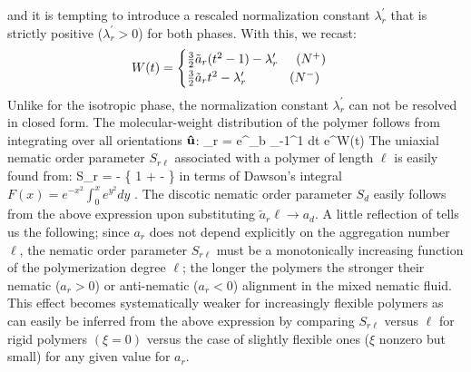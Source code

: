 and it is tempting to introduce a rescaled  normalization constant $\lambda_{r}^{\prime}$ that is strictly positive ($\lambda_{r}^{\prime} > 0$) for both phases. With this, we recast:
  \begin{align}
W(t) =  
\begin{cases}
\frac{3}{2} \tilde{a}_{r} (t^{2} -1) - \lambda_{r}^{\prime} \hspace{0.5cm}  (N^{+})   \\
\frac{3}{2} \tilde{a}_{r} t^{2}  - \lambda_{r}^{\prime} \hspace{1.2cm}  (N^{-}) 
\end{cases}
 \end{align}
 Unlike for the isotropic phase, the normalization constant $\lambda_{r}^{\prime}$ can not be resolved in closed form. The  molecular-weight distribution of the polymer follows from integrating  over all orientations ${\bf \hat{u}}$:
 \beq
 \rho_{r \ell} = \ell e^{\varepsilon_{b}}  \int_{-1}^{1} dt e^{\ell W(t)}
 \eeq
The uniaxial nematic order parameter $S_{r \ell}$ associated with a  polymer of length $\ell$ is easily found from:
\beq
S_{r \ell} = - \left \{ 1 +   -   \right \}  
\label{spol}
\eeq
in terms of Dawson's integral $F(x) = e^{-x^{2}} \int_{0}^{x}e^{y^{2}}dy$ \cite{abram}. The discotic nematic order parameter $S_{d}$  easily follows from the above expression upon substituting $\tilde{a}_{r} \ell \rightarrow a_{d}$.   A little reflection of  tells us the following; since $a_{r}$ does not depend explicitly on the aggregation number $\ell$, the nematic order parameter $S_{r \ell}$ must be a monotonically increasing function of the polymerization degree $\ell $; the longer the polymers the stronger their nematic ($ a_{r} >0$) or anti-nematic ($ a_{r} <0$) alignment in the mixed nematic fluid. This effect becomes systematically weaker for increasingly flexible polymers as can easily be inferred from the above expression by comparing  $S_{r \ell}$ versus $\ell$ for rigid polymers $(\xi =0)$ versus the case of slightly flexible ones ($\xi $ nonzero but small) for any given value for $a_{r}$. 

